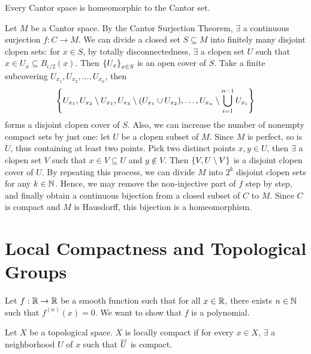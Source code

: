 \begin{thm}
    Every Cantor space is homeomorphic to the Cantor set.
    \begin{pf}
        Let $M$ be a Cantor space. By the Cantor Surjection Theorem, $\exists$ a continuous surjection $f: C \to M$. We can divide a closed set $S \subseteq M$ into finitely many disjoint clopen sets: for $x \in S$, by totally disconnectedness, $\exists$ a clopen set $U$ such that $x \in U_x \subseteq B_{\epsilon/2}(x)$. Then $\set{U_x}_{x \in S}$ is an open cover of $S$. Take a finite subcovering $U_{x_1}, U_{x_2}, \ldots, U_{x_n}$, then
        \[
        \set{U_{x_1}, U_{x_2} \setminus U_{x_1}, U_{x_3} \setminus (U_{x_1} \cup U_{x_2}), \ldots, U_{x_n} \setminus \bigcup_{i=1}^{n-1} U_{x_i}}
        \]
        forms a disjoint clopen cover of $S$. Also, we can increase the number of nonempty compact sets by just one: let $U$ be a clopen subset of $M$. Since $M$ is perfect, so is $U$, thus containing at least two points. Pick two distinct points $x, y \in U$, then $\exists$ a clopen set $V$ such that $x \in V \subseteq U$ and $y \notin V$. Then $\set{V, U \setminus V}$ is a disjoint clopen cover of $U$. By repeating this process, we can divide $M$ into $2^k$ disjoint clopen sets for any $k \in \N$. Hence, we may remove the non-injective part of $f$ step by step, and finally obtain a continuous bijection from a closed subset of $C$ to $M$. Since $C$ is compact and $M$ is Hausdorff, this bijection is a homeomorphism.
    \end{pf}
\end{thm}

\section{Local Compactness and Topological Groups}

Let $f: \R \to \R$ be a smooth function such that for all $x \in \R$, there exists $n \in \N$ such that $f^{(n)}(x) = 0$. We want to show that $f$ is a polynomial.

\begin{df}
    Let $X$ be a topological space. $X$ is locally compact if for every $x \in X$, $\exists$ a neighborhood $U$ of $x$ such that $\Bar{U}$ is compact.
\end{df}


